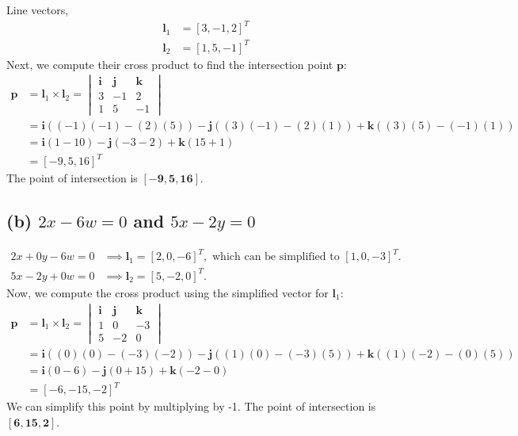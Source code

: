 \documentclass[12pt]{article}
\begin{document}
Line vectors,
\begin{align*}
    \mathbf{l}_1 &= [3, -1, 2]^T \\
    \mathbf{l}_2 &= [1, 5, -1]^T
\end{align*}
Next, we compute their cross product to find the intersection point $\mathbf{p}$:
\begin{align*}
    \mathbf{p} &= \mathbf{l}_1 \times \mathbf{l}_2 = 
    \begin{vmatrix}
        \mathbf{i} & \mathbf{j} & \mathbf{k} \\
        3 & -1 & 2 \\
        1 & 5 & -1
    \end{vmatrix} \\
    &= \mathbf{i}((-1)(-1) - (2)(5)) - \mathbf{j}((3)(-1) - (2)(1)) + \mathbf{k}((3)(5) - (-1)(1)) \\
    &= \mathbf{i}(1 - 10) - \mathbf{j}(-3 - 2) + \mathbf{k}(15 + 1) \\
    &= [-9, 5, 16]^T
\end{align*}
The point of intersection is $\mathbf{[-9, 5, 16]}$.

\subsection*{(b) $2x - 6w = 0$ and $5x - 2y = 0$}

\begin{align*}
    2x + 0y - 6w = 0 &\implies \mathbf{l}_1 = [2, 0, -6]^T, \text{ which can be simplified to } [1, 0, -3]^T. \\
    5x - 2y + 0w = 0 &\implies \mathbf{l}_2 = [5, -2, 0]^T.
\end{align*}
Now, we compute the cross product using the simplified vector for $\mathbf{l}_1$:
\begin{align*}
    \mathbf{p} &= \mathbf{l}_1 \times \mathbf{l}_2 = 
    \begin{vmatrix}
        \mathbf{i} & \mathbf{j} & \mathbf{k} \\
        1 & 0 & -3 \\
        5 & -2 & 0
    \end{vmatrix} \\
    &= \mathbf{i}((0)(0) - (-3)(-2)) - \mathbf{j}((1)(0) - (-3)(5)) + \mathbf{k}((1)(-2) - (0)(5)) \\
    &= \mathbf{i}(0 - 6) - \mathbf{j}(0 + 15) + \mathbf{k}(-2 - 0) \\
    &= [-6, -15, -2]^T
\end{align*}
We can simplify this point by multiplying by -1. The point of intersection is $\mathbf{[6, 15, 2]}$.
\end{document}
